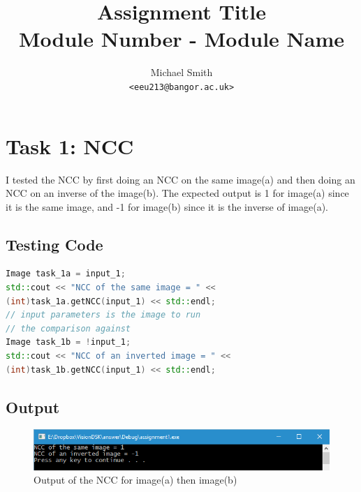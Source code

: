 \documentclass[pdftex,a4paper,10pt,titlepage]{article}
\begin{document}
\title{\textbf{Assignment Title} \\
Module Number - Module Name \\
}

\author{
Michael Smith \\ \texttt{<eeu213@bangor.ac.uk>}
}





\pagebreak

\pagestyle{fancy}
\fancyhf{}
\cfoot{\thepage}


\pagebreak

\section {Task 1: NCC}
I tested the NCC by first doing an NCC on the same image(a) and then doing an NCC on an inverse of the image(b). The expected output is 1 for image(a) since it is the same image, and -1 for image(b) since it is the inverse of image(a).
\subsection{Testing Code}
\begin{lstlisting}[language=C++]
Image task_1a = input_1;
std::cout << "NCC of the same image = " <<
(int)task_1a.getNCC(input_1) << std::endl;
// input parameters is the image to run
// the comparison against
Image task_1b = !input_1;
std::cout << "NCC of an inverted image = " << 
(int)task_1b.getNCC(input_1) << std::endl;                  
\end{lstlisting}

\subsection{Output}
\begin{figure}[h]
\includegraphics{Task1.png} 
\center
\caption {Output of the NCC for image(a) then image(b)}
\label{fig:copied_image}
\end{figure}
\end{document}
